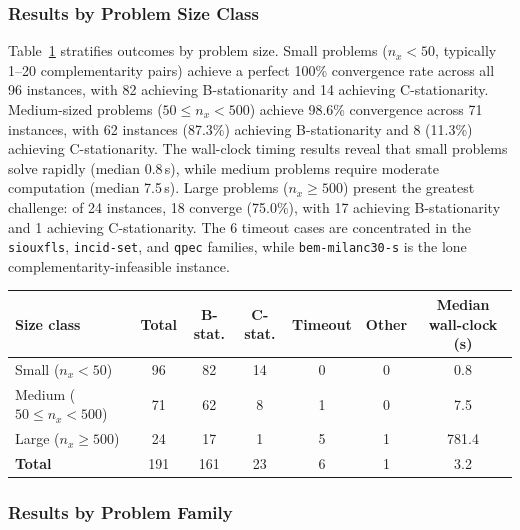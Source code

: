 \subsubsection{Results by Problem Size Class}
\label{sec:macmpec_size}

Table~\ref{tab:macmpec_size} stratifies outcomes by problem size.
Small problems ($n_x < 50$, typically 1--20 complementarity pairs) achieve
a perfect 100\% convergence rate across all 96 instances, with 82 achieving
B-stationarity and 14 achieving C-stationarity.
Medium-sized problems ($50 \leq n_x < 500$) achieve 98.6\% convergence
across 71 instances, with 62 instances (87.3\%) achieving B-stationarity
and 8 (11.3\%) achieving C-stationarity.
The wall-clock timing results reveal that small problems solve rapidly (median 0.8\,s),
while medium problems require moderate computation (median 7.5\,s).
Large problems ($n_x \geq 500$) present the greatest challenge: of 24 instances,
18 converge (75.0\%), with 17 achieving B-stationarity and 1 achieving C-stationarity.
The 6 timeout cases are concentrated in the \texttt{siouxfls}, \texttt{incid-set},
and \texttt{qpec} families, while \texttt{bem-milanc30-s} is the lone
complementarity-infeasible instance.

\begin{table}[!htb]
{\begin{tabular}{@{}lcccccc@{}}
\toprule
Size class
  & Total
  & B-stat.
  & C-stat.
  & Timeout
  & Other
  & Median wall-clock (s) \\
\midrule
Small  ($n_x < 50$)          & 96 & 82 & 14 & 0 & 0 & 0.8 \\
Medium ($50 \leq n_x < 500$) & 71 & 62 & 8  & 1 & 0 & 7.5 \\
Large  ($n_x \geq 500$)      & 24 & 17 & 1  & 5 & 1 & 781.4 \\
\midrule
\textbf{Total}               & 191 & 161 & 23 & 6 & 1 & 3.2 \\
\bottomrule
\end{tabular}}
\label{tab:macmpec_size}
\end{table}


\subsubsection{Results by Problem Family}
\label{sec:macmpec_family}

